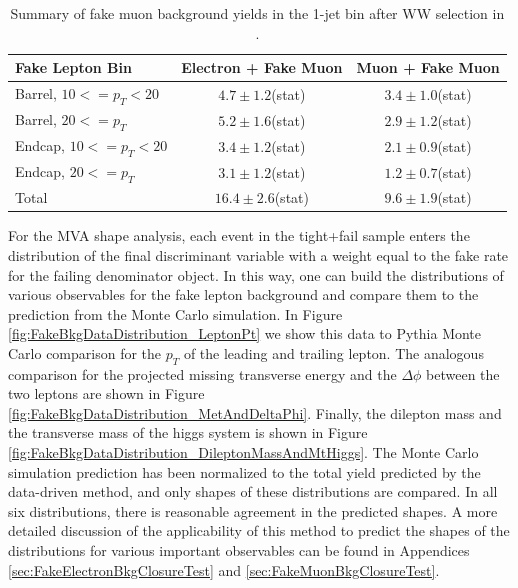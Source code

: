 \begin{table}[!htbp]
\begin{center}
\begin{tabular}{|l|c|c|}
\hline
Fake Lepton Bin               & Electron + Fake Muon & Muon + Fake Muon  \\
\hline
Barrel, $10 <= p_{T} < 20$    &  $4.7 \pm  1.2$(stat)	  &   $3.4 \pm  1.0$(stat) \\
Barrel, $20 <= p_{T} $        &  $5.2 \pm  1.6$(stat)	  &   $2.9 \pm  1.2$(stat) \\
Endcap, $10 <= p_{T} < 20$    &  $3.4 \pm  1.2$(stat)	  &   $2.1 \pm  0.9$(stat) \\
Endcap, $20 <= p_{T} $        &  $3.1 \pm  1.2$(stat)	  &   $1.2 \pm  0.7$(stat) \\
\hline
Total                         &  $16.4 \pm  2.6$(stat)     &   $9.6 \pm  1.9$(stat) \\
\hline
\end{tabular}
\caption{Summary of fake muon background yields in the 1-jet bin after WW selection in \intlumi.}
\label{tab:FakeMuonBkgPrediction_WWSelection_1JetBin}
\end{center}
\end{table}

For the MVA shape analysis, each event in the tight+fail sample enters the 
distribution of the final discriminant variable with a weight equal to the 
fake rate for the failing denominator object. In this way, one can build
the distributions of various observables for the fake lepton background
and compare them to the prediction from the Monte Carlo simulation. 
In Figure \ref{fig:FakeBkgDataDistribution_LeptonPt} we show this data to Pythia Monte Carlo 
comparison for the $p_{T}$ of the leading and trailing lepton. The analogous comparison
for the projected missing transverse energy and the $\Delta\phi$ between the two 
leptons are shown in Figure \ref{fig:FakeBkgDataDistribution_MetAndDeltaPhi}. Finally,
the dilepton mass and the transverse mass of the higgs system is shown in 
Figure \ref{fig:FakeBkgDataDistribution_DileptonMassAndMtHiggs}. The Monte Carlo simulation
prediction has been normalized to the total yield predicted by the data-driven method,
and only shapes of these distributions are compared. In all six distributions, there is
reasonable agreement in the predicted shapes. A more detailed 
discussion of the applicability of this method to predict the shapes of 
the distributions for various important observables can be found in
Appendices \ref{sec:FakeElectronBkgClosureTest} and 
\ref{sec:FakeMuonBkgClosureTest}.


